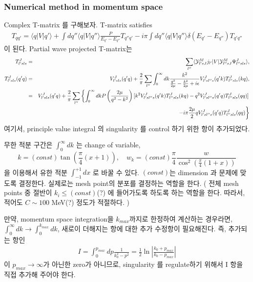 \documentclass[10pt]{book}
\newcommand{\bea}{\begin{eqnarray}}
\newcommand{\eea}{\end{eqnarray}}
\newcommand{\no}{\nonumber \\}
\def\la{\langle}
\def\ra{\rangle}
\begin{document}
\subsubsection{Numerical method in momentum space}
Complex T-matrix 를 구해보자.
T-matrix satisfies
\bea
T_{qq'}=\la q|V|q'\ra+\int dq'' \la q|V|q''\ra\frac{P}{E_{q'}-E_{q''}} T_{q'' q'}
                                 -i\pi\int dq''\la q|V|q''\ra\delta(E_{q'}-E_{q''})T_{q' q''}
\eea
이 된다. 
Partial wave projected T-matrix는
\bea
T^J_{l'sls}
&=&\sum_{l''}\la {\cal Y}^{M}_{l' s J} j_{l'}|V|
               {\cal Y}^{M}_{l'' s J} \Psi^J_{l'' s ls}\ra,\no
T^J_{l'sls}(q' q)
&=& V^J_{l'sls}(q'q)+\frac{2}{\pi}\sum_{l''}
   \int_0^\infty dk 
   \frac{k^2}{\frac{q^2}{2\mu}-\frac{k^2}{2\mu}+i\epsilon}
   V^J_{l'sl''s}(q'k)T^J_{l''s ls}(kq),\no
&=&V^J_{l'sls}(q'q)+\frac{2}{\pi}\sum_{l''}
   \left\{
   \int_0^\infty dk 
   P\left(\frac{2\mu}{q^2-k^2}\right)
   [k^2 V^J_{l'sl''s}(q'k)T^J_{l''s ls}(kq)
   -q^2 V^J_{l'sl''s}(q'q)T^J_{l''s ls}(q q)]
   \right.\no & &\left.
   -i\pi \frac{2\mu}{2}q V^J_{l'sl''s}(q'q)T^J_{l''s ls}(qq)
   \right\}
\eea
여기서, principle value integral 의 singularity 를 
control 하기 위한 항이 추가되었다. 

무한 적분 구간은 $\int_0^\infty dk$ 는 change of variable,
$$k=(const)\tan(\frac{\pi}{4}(x+1)),\quad 
w_k=(const)\frac{\pi}{4}\frac{w}{\cos^2(\frac{\pi}{4}(1+x))}$$
을 이용해서 
유한 적분 $\int_{-1}^{+1} dx$ 로 바꿀 수 있다. $(const)$는 dimension
과 문제에 맞도록 결정한다. 실제로는 mesh point의 분포를 결정하는 역할을 한다.
( 전체 mesh points 중 
절반이  $k_i\le (const)$(?) 에 들어가도록 하도록 하는 역할을 한다.
따라서, 적어도 $C\sim 100$ MeV(?) 정도가 적절하다. )

만약, momentum space integration을 $k_{max}$까지로 한정하여 계산하는 경우라면,
$\int_0^\infty dk \to \int_0^{k_{max}}dk $, 새로이 더해지는 항에 대한 
추가 수정항이 필요해진다. 즉, 추가되는 항인
\bea 
I=\int_0^{p_{max}}dp \frac{1}{k_0^2-p^2}
 =\frac{1}{2}\ln |\frac{k_0+p_{max}}{k_0-p_{max}}|
\eea 
이 $p_{max}\to \infty$가 아닌한 zero가 아니므로, singularity 를 
regulate하기 위해서 I 항을 직접 추가해 주어야 한다. 
\end{document}
